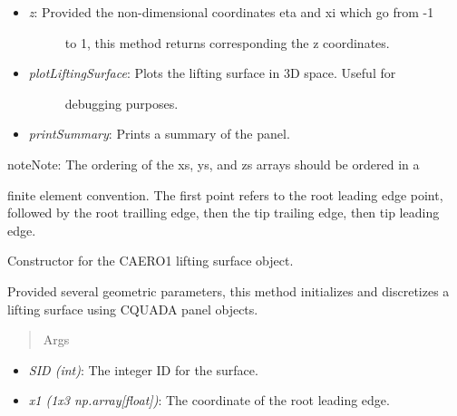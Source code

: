 \documentclass[letterpaper,10pt,english]{sphinxmanual}
\begin{document}
\begin{fulllineitems}
\begin{itemize}
\item {} \begin{description}
\item[{\emph{z}: Provided the non-dimensional coordinates eta and xi which go from -1}] \leavevmode
to 1, this method returns corresponding the z coordinates.

\end{description}

\item {} \begin{description}
\item[{\emph{plotLiftingSurface}: Plots the lifting surface in 3D space. Useful for}] \leavevmode
debugging purposes.

\end{description}

\item {} 
\emph{printSummary}: Prints a summary of the panel.

\end{itemize}

\begin{notice}{note}{Note:}
The ordering of the xs, ys, and zs arrays should be ordered in a
\end{notice}

finite element convention. The first point refers to the root leading edge
point, followed by the root trailling edge, then the tip trailing edge,
then tip leading edge.

\begin{fulllineitems}
\label{aerodynamics:AeroComBAT.Aerodynamics.CAERO1.__init__}
Constructor for the CAERO1 lifting surface object.

Provided several geometric parameters, this method initializes and
discretizes a lifting surface using CQUADA panel objects.
\begin{quote}\begin{description}
\item[{Args}] \leavevmode
\end{description}\end{quote}
\begin{itemize}
\item {} 
\emph{SID (int)}: The integer ID for the surface.

\item {} 
\emph{x1 (1x3 np.array{[}float{]})}: The coordinate of the root leading edge.


\end{itemize}
\end{fulllineitems}
\end{fulllineitems}
\end{document}
